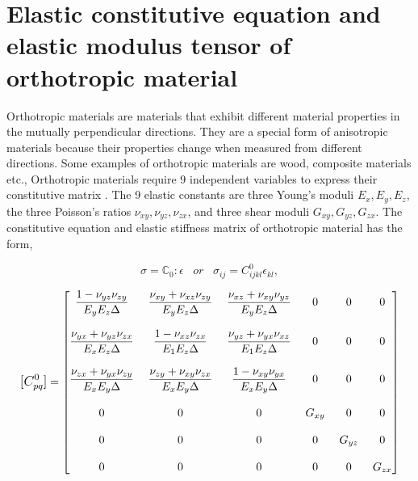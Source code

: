 \documentclass[12pt,a4paper,twoside,openright]{report}
\begin{document}
\section{Elastic constitutive equation and elastic modulus tensor of orthotropic material}\label{Constitutive matrix}
\indent\indent\indent Orthotropic materials are materials that exhibit different material properties in the mutually perpendicular directions. They are a special form of anisotropic materials because their properties change when measured from different directions. Some examples of orthotropic materials are wood, composite materials etc., Orthotropic materials require 9 independent variables to express their constitutive matrix \citep{ortho}. The 9 elastic constants are three Young's moduli $E_{x},E_{y},E_{z}$, the three Poisson's ratios $\nu_{xy},\nu_{yz},\nu_{zx}$, and three shear moduli $G_{xy},G_{yz},G_{zx}$. The constitutive equation and elastic stiffness matrix of orthotropic material \citep{lempriere1968poisson} has the form,

\begin{equation}
  \sigma = \mathbb{C}_{0} : \epsilon \;\;\;   or \;\;\;  \sigma_{ij}  =  C^{0}_{ijkl}\epsilon_{kl},
\end{equation}

$$
\mathlarger{ [C^{0}_{pq}]} =  
 \begin{bmatrix}
 \mathlarger{ \frac{1 - \nu_{yz}\nu_{zy}}{E_{y}E_{z}\Delta} } \;&  \mathlarger{  \frac{\nu_{xy} + \nu_{xz}\nu_{zy}}{E_{y}E_{z}\Delta}}   \;& \mathlarger{  \frac{\nu_{xz} + \nu_{xy}\nu_{yz}}{E_{y}E_{z}\Delta} }  \;&  \mathlarger{  0}  \;&  \mathlarger{ 0}  \;& \mathlarger{  0}  \\
 \\
    \mathlarger{ \frac{\nu_{yx} + \nu_{yz}\nu_{zx}}{E_{x}E_{z}\Delta} }  \;& \mathlarger{  \frac{1 - \nu_{xz}\nu_{zx}}{E_{1}E_{z}\Delta} }\; & \mathlarger{ \frac{\nu_{yz} +\nu_{yx}\nu_{xz}}{E_{1}E_{z}\Delta} } \; & \mathlarger{ 0}\; &\mathlarger{  0}\; & \mathlarger{ 0}\\
  \\
   \mathlarger{  \frac{\nu_{zx} + \nu_{yx}\nu_{zy}}{E_{x}E_{y}\Delta}}  \;& \mathlarger{   \frac{\nu_{zy} + \nu_{xy}\nu_{zx}}{E_{x}E_{y}\Delta} }\;&\mathlarger{  \frac{1 - \nu_{xy}\nu_{yx}}{E_{x}E_{y}\Delta} } \;&\mathlarger{  0 }\;& \mathlarger{ 0 }\;&\mathlarger{  0} \\ 
\\

 
 \mathlarger{  0} \;&  \mathlarger{  0 } \;&  \mathlarger{  0 }\;&\mathlarger{ G_{xy}} \;& \mathlarger{0} \;& \mathlarger{0} \\
  \\
 \mathlarger{ 0} \;&  \mathlarger{  0 }\;&  \mathlarger{  0 } \;& \mathlarger{0 }\;& \mathlarger{ G_{yz} }\;&\mathlarger{ 0} \\
  \\
  \mathlarger{0}\;&  \mathlarger{  0 } \;&  \mathlarger{  0 } \;& \mathlarger{0 }\;& \mathlarger{0} \;& \mathlarger{G_{zx}} 
 \end{bmatrix}
 $$\\
 
\end{document}
